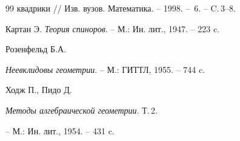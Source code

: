 \begin{thebibliography}{99}
{квадрики} // Изв. вузов. Математика. -- 1998. -- \No\,6. -- C.\,3--8.




Картан Э. {\em Теория спиноров}. -- М.: Ин. лит., 1947. -- 223 c.




Розенфельд Б.А.


{\em Неевклидовы геометрии}. -- М.: ГИТТЛ, 1955. -- 744 c.




Ходж П., Пидо Д.


{\em Методы алгебраической геометрии}. Т.\,2.


-- М.: Ин. лит., 1954. -- 431 c.





\end{thebibliography}





\vskip 0.5cm











\label{end}





